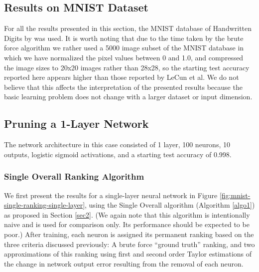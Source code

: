 \subsection{Results on MNIST Dataset}
For all the results presented in this section, the MNIST database of Handwritten Digits by \cite{lecun-mnisthandwrittendigit-2010} was used. It is worth noting that due to the time taken by the brute force algorithm we rather used a 5000 image subset of the MNIST database in which we have normalized the pixel values between 0 and 1.0, and compressed the image sizes to 20x20 images rather than 28x28, so the starting test accuracy reported here appears higher than those reported by LeCun et al. We do not believe that this affects the interpretation of the presented results because the basic learning problem does not change with a larger dataset or input dimension.

\subsection{Pruning a 1-Layer Network}
The network architecture in this case consisted of 1 layer, 100 neurons, 10 outputs, logistic sigmoid activations, and a starting test accuracy of 0.998.

\subsubsection{Single Overall Ranking Algorithm}
We first present the results for a single-layer neural network in Figure \ref{fig:mnist-single-ranking-single-layer}, using the Single Overall algorithm (Algorithm \ref{algo1}) as proposed in Section \ref{sec2}. (We again note that this algorithm is intentionally naive and is used for comparison only. Its performance should be expected to be poor.) After training, each neuron is assigned its permanent ranking based on the three criteria discussed previously: A brute force ``ground truth'' ranking, and two approximations of this ranking using first and second order Taylor estimations of the change in network output error resulting from the removal of each neuron. 


